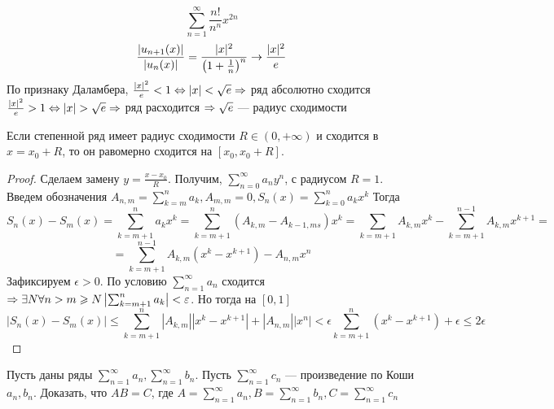\begin{example}
    \[\sum_{n = 1}^\infty \frac{n!}{n^n}x^{2n}\]
    \[\frac{|u_{n + 1}(x)|}{|u_n(x)|} = \frac{|x|^2}{\left(1 + \frac{1}{n}\right)^n} \rightarrow \frac{|x|^2}{e}\]
    По признаку Даламбера, \(\frac{|x|^2}{e} < 1 \Leftrightarrow |x| < \sqrt{e} \Rightarrow\) ряд абсолютно сходится
    \(\frac{|x|^2}{e} > 1 \Leftrightarrow |x| > \sqrt{e} \Rightarrow\) ряд расходится  \(\Rightarrow \sqrt{e}\) --- радиус сходимости 
\end{example}

\begin{theorem}[Абеля]
    Если степенной ряд имеет радиус сходимости \(R \in (0, +\infty)\) и сходится в \(x = x_0 + R\), то он равомерно сходится на \([x_0, x_0 + R]\).
\end{theorem}
\begin{proof}
    Сделаем замену \(y = \frac{x - x_0}{R}\). Получим, \(\sum_{n = 0}^\infty a_ny^n\), с радиусом \(R = 1\). Введем обозначения \(A_{n, m} = \sum_{k = m}^n a_k, A_{m, m} = 0, S_n(x) = \sum_{k = 0}^n a_kx^k\)
    Тогда 
    \[S_n(x) - S_m(x) = \sum_{k = m + 1}^n a_kx^k = \sum_{k = m + 1}^n (A_{k, m} - A_{k-1, ms})x^k = \sum_{k = m + 1}A_{k, m}x^k - \sum_{k = m + 1}^{n - 1}A_{k, m} x^{k + 1}= \]
    \[ = \sum_{k = m + 1}^{n - 1}A_{k, m}(x^k - x^{k + 1}) - A_{n, m}x^n\]
    Зафиксируем \(\epsilon > 0\). По условию \(\sum_{n = 1}^\infty a_n\) сходится \(\Rightarrow \exists N \forall n > m \geqslant N \left|\sum_{k = m + 1}^n a_k\right| < \varepsilon\). Но тогда на \([0, 1]\)
    \[\left|S_n(x) - S_m(x)\right| \le \sum_{k = m + 1}^n \left|A_{k, m}\right||x^k - x^{k + 1}| + |A_{n, m}||x^n| < \epsilon \sum_{k = m + 1}^n(x^k - x^{k + 1}) + \epsilon \le 2\epsilon\]
\end{proof}
\begin{problem}
    Пусть даны ряды \(\sum_{n = 1}^\infty a_n, \sum_{n = 1}^\infty b_n\). Пусть \(\sum_{n = 1}^\infty c_n\) --- произведение по Коши \(a_n, b_n\). Доказать, что \(AB = C\), где \(A = \sum_{n = 1}^\infty a_n, B = \sum_{n = 1}^\infty b_n, C = \sum_{n = 1}^\infty c_n\)
\end{problem}